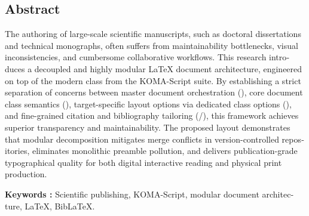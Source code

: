 \begin{otherlanguage}{english}
\section*{Abstract}

The authoring of large-scale scientific manuscripts, such as doctoral dissertations and technical monographs,
often suffers from maintainability bottlenecks, visual inconsistencies, and cumbersome collaborative workflows.
This research introduces a decoupled and highly modular \LaTeX{} document architecture,
engineered on top of the modern  class from the KOMA-Script suite.
By establishing a strict separation of concerns between master document orchestration (),
core document class semantics (),
target-specific layout options via dedicated class options (),
and fine-grained citation and bibliography tailoring (/),
this framework achieves superior transparency and maintainability.
The proposed layout demonstrates that modular decomposition mitigates merge conflicts in version-controlled repositories,
eliminates monolithic preamble pollution,
and delivers publication-grade typographical quality for both digital interactive reading and physical print production.

\vspace{0.8em}
\noindent\textbf{Keywords :} Scientific publishing, KOMA-Script, modular document architecture, \LaTeX{}, Bib\LaTeX.
\end{otherlanguage}

